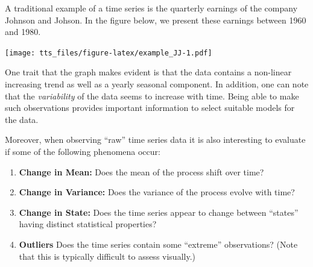 \documentclass[]{book}
\newenvironment{Shaded}{\begin{snugshade}}{\end{snugshade}}
\newcommand{\CommentTok}[1]{\textcolor[rgb]{0.56,0.35,0.01}{\textit{#1}}}
\newcommand{\DataTypeTok}[1]{\textcolor[rgb]{0.13,0.29,0.53}{#1}}
\newcommand{\DecValTok}[1]{\textcolor[rgb]{0.00,0.00,0.81}{#1}}
\newcommand{\KeywordTok}[1]{\textcolor[rgb]{0.13,0.29,0.53}{\textbf{#1}}}
\newcommand{\NormalTok}[1]{#1}
\newcommand{\StringTok}[1]{\textcolor[rgb]{0.31,0.60,0.02}{#1}}
\providecommand{\tightlist}{%
  \setlength{\itemsep}{0pt}\setlength{\parskip}{0pt}}
\theoremstyle{definition}
\theoremstyle{definition}
\theoremstyle{definition}
\theoremstyle{remark}
\let\BeginKnitrBlock\begin \let\EndKnitrBlock\end
\begin{document}
\BeginKnitrBlock{example}
\protect\hypertarget{exm:jjquarterly}{}{\label{exm:jjquarterly} }A
traditional example of a time series is the quarterly earnings of the
company Johnson and Johson. In the figure below, we present these
earnings between 1960 and 1980.
\EndKnitrBlock{example}

\begin{Shaded}
\end{Shaded}

\texttt{[image: tts\_files/figure-latex/example\_JJ-1.pdf]}

One trait that the graph makes evident is that the data contains a
non-linear increasing trend as well as a yearly seasonal component. In
addition, one can note that the \emph{variability} of the data seems to
increase with time. Being able to make such observations provides
important information to select suitable models for the data.

Moreover, when observing ``raw'' time series data it is also interesting
to evaluate if some of the following phenomena occur:

\begin{enumerate}
\def\labelenumi{\arabic{enumi}.}
\tightlist
\item
  \textbf{Change in Mean:} Does the mean of the process shift over time?
\item
  \textbf{Change in Variance:} Does the variance of the process evolve
  with time?
\item
  \textbf{Change in State:} Does the time series appear to change
  between ``states'' having distinct statistical properties?
\item
  \textbf{Outliers} Does the time series contain some ``extreme''
  observations? (Note that this is typically difficult to assess
  visually.)
\end{enumerate}
\end{document}
